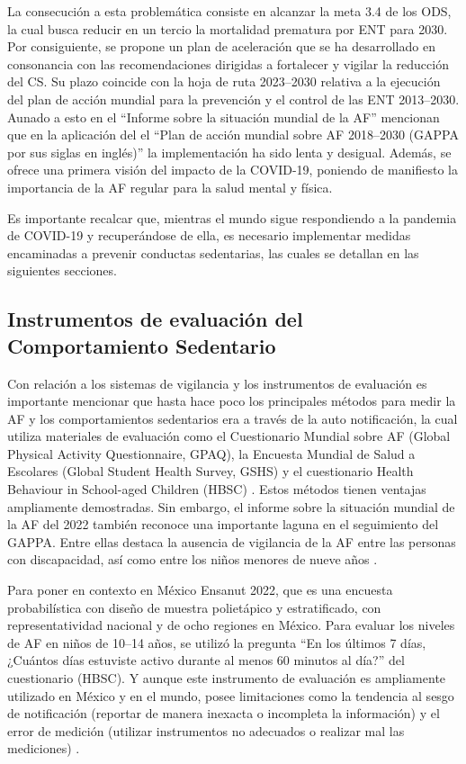 La consecución a esta problemática consiste en alcanzar la meta 3.4 de los ODS, la cual busca reducir en un tercio la mortalidad prematura por ENT para 2030. Por consiguiente, se propone un plan de aceleración que se ha desarrollado en consonancia con las recomendaciones dirigidas a fortalecer y vigilar la reducción del CS. Su plazo coincide con la hoja de ruta 2023--2030 relativa a la ejecución del plan de acción mundial para la prevención y el control de las ENT 2013--2030. Aunado a esto en el ``Informe sobre la situación mundial de la AF'' mencionan que en la aplicación del el ``Plan de acción mundial sobre AF 2018--2030 (GAPPA por sus siglas en inglés)'' \citep{WHO2022InformeActividad} la implementación ha sido lenta y desigual. Además, se ofrece una primera visión del impacto de la COVID-19, poniendo de manifiesto la importancia de la AF regular para la salud mental y física.

Es importante recalcar que, mientras el mundo sigue respondiendo a la pandemia de COVID-19 y recuperándose de ella, es necesario implementar medidas encaminadas a prevenir conductas sedentarias, las cuales se detallan en las siguientes secciones.

\subsection{Instrumentos de evaluación del Comportamiento Sedentario}
\label{subsec:instrumentos_evaluacion}

Con relación a los sistemas de vigilancia y los instrumentos de evaluación es importante mencionar que hasta hace poco los principales métodos para medir la AF y los comportamientos sedentarios era a través de la auto notificación, la cual utiliza materiales de evaluación como el Cuestionario Mundial sobre AF (Global Physical Activity Questionnaire, GPAQ), la Encuesta Mundial de Salud a Escolares (Global Student Health Survey, GSHS) y el cuestionario Health Behaviour in School-aged Children (HBSC) \citep{CDC_GSHS,WHO2020}. Estos métodos tienen ventajas ampliamente demostradas. Sin embargo, el informe sobre la situación mundial de la AF del 2022 también reconoce una importante laguna en el seguimiento del GAPPA. Entre ellas destaca la ausencia de vigilancia de la AF entre las personas con discapacidad, así como entre los niños menores de nueve años \citep{WHO2022InformeActividad}.

Para poner en contexto en México Ensanut 2022, que es una encuesta probabilística con diseño de muestra polietápico y estratificado, con representatividad nacional y de ocho regiones en México. Para evaluar los niveles de AF en niños de 10--14 años, se utilizó la pregunta ``En los últimos 7 días, ¿Cuántos días estuviste activo durante al menos 60 minutos al día?'' del cuestionario (HBSC). Y aunque este instrumento de evaluación es ampliamente utilizado en México y en el mundo, posee limitaciones como la tendencia al sesgo de notificación (reportar de manera inexacta o incompleta la información) y el error de medición (utilizar instrumentos no adecuados o realizar mal las mediciones) \citep{Romero2022}.

